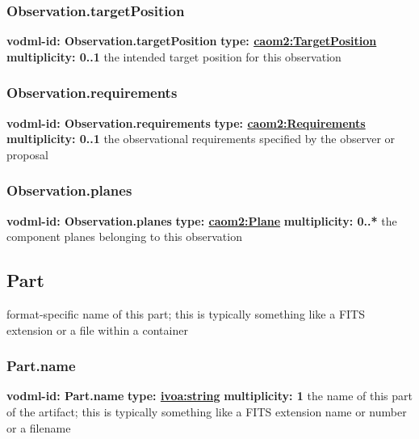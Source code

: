     \subsubsection{Observation.targetPosition}
      \textbf{vodml-id: Observation.targetPosition} \newline
      \textbf{type: \hyperref[sect:TargetPosition]{caom2:TargetPosition}} \newline
      \textbf{multiplicity: 0..1} \newline
      the intended target position for this observation

    \subsubsection{Observation.requirements}
      \textbf{vodml-id: Observation.requirements} \newline
      \textbf{type: \hyperref[sect:Requirements]{caom2:Requirements}} \newline
      \textbf{multiplicity: 0..1} \newline
      the observational requirements specified by the observer or proposal

    \subsubsection{Observation.planes}
      \textbf{vodml-id: Observation.planes} \newline
      \textbf{type: \hyperref[sect:Plane]{caom2:Plane}} \newline
      \textbf{multiplicity: 0..*} \newline
      the component planes belonging to this observation

  \subsection{Part}
  \label{sect:Part}
    format-specific name of this part; this is typically something like a FITS extension or a file within a container

    \subsubsection{Part.name}
      \textbf{vodml-id: Part.name} \newline
      \textbf{type: \hyperref[sect:ivoa]{ivoa:string}} \newline
      \textbf{multiplicity: 1} \newline
      the name of this part of the artifact; this is typically something like a FITS extension name or number or a filename

